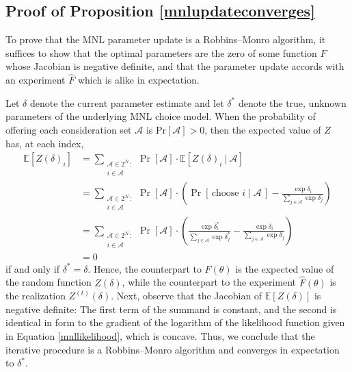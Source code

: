 \documentclass[preprint,12pt,authoryear]{elsarticle}
\begin{document}
\subsection{Proof of Proposition \ref{mnlupdateconverges}}
To prove that the MNL parameter update is a Robbins--Monro algorithm, it suffices to show that the optimal parameters are the zero of some function $F$ whose Jacobian is negative definite, and that the parameter update accords with an experiment $\hat F$ which is alike in expectation.  

Let $\delta$ denote the current parameter estimate and let $\delta^*$ denote the true, unknown parameters of the underlying MNL choice model. When the probability of offering each consideration set $\mathcal{A}$ is $\operatorname{Pr[\mathcal{A}]} > 0$, then the expected value of $Z$ has, at each index,
\begin{align}
\mathbb{E}\left[Z(\delta)_i \right] &= \sum_{\substack{\mathcal{A} \in 2^{\mathcal{N}}: \\ i \in \mathcal{A}}}\operatorname{Pr}\left[\mathcal{A}\right] \cdot \mathbb{E}\left[Z(\delta)_i~|~\mathcal{A}\right] \\
&=   \sum_{\substack{\mathcal{A} \in 2^{\mathcal{N}}: \\ i \in \mathcal{A}}}\operatorname{Pr}\left[\mathcal{A}\right] \cdot \left(\operatorname{Pr}\left[\,\text{choose } i\;|\;\mathcal{A}\,\right] - \frac{\exp \delta_i}{\sum_{j\in \mathcal{A}} \exp \delta_j} \right) \\
&= \sum_{\substack{\mathcal{A} \in 2^{\mathcal{N}}: \\ i \in \mathcal{A}}}\operatorname{Pr}\left[\mathcal{A}\right] \cdot \left(\frac{\exp  \delta_i^*}{\sum_{j\in \mathcal{A}} \exp \delta_j^*} - \frac{\exp \delta_i}{\sum_{j\in \mathcal{A}} \exp \delta_j} \right) \\
&= 0
\end{align}
if and only if $\delta^* = \delta$. Hence, the counterpart to $F(\theta)$ is the expected value of the random function $Z(\delta)$, while the counterpart to the experiment $\hat F(\theta)$ is the realization $Z^{(t)}(\delta)$. Next, observe that the Jacobian of $\mathbb{E}\left[Z(\delta) \right]$ is negative definite: The first term of the summand is constant, and the second is identical in form to the gradient of the logarithm of the likelihood function given in Equation \eqref{mnllikelihood}, which is concave. Thus, we conclude that the iterative procedure is a Robbins--Monro algorithm and converges in expectation to $\delta^*$. 
\end{document}
